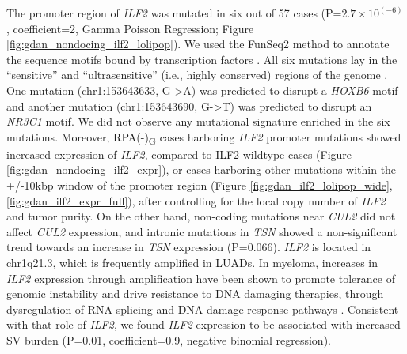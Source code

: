 \documentclass[phd,tocprelim]{cornell}
\begin{document}
The promoter region of \textit{ILF2} was mutated in six out of 57 cases (P=$2.7 \times 10^(-6)$, coefficient=2, Gamma Poisson Regression; Figure \ref{fig:gdan_nondocing_ilf2_lolipop}). We used the FunSeq2 method to annotate the sequence motifs bound by transcription factors \cite{Fu2014-so}. All six mutations lay in the “sensitive” and “ultrasensitive” (i.e., highly conserved) regions of the genome \cite{Khurana2013-qc}. One mutation (chr1:153643633, G->A) was predicted to disrupt a \textit{HOXB6} motif and another mutation (chr1:153643690, G->T) was predicted to disrupt an \textit{NR3C1} motif. We did not observe any mutational signature enriched in the six mutations. Moreover, RPA(-)\textsubscript{G} cases harboring \textit{ILF2} promoter mutations showed increased expression of \textit{ILF2}, compared to ILF2-wildtype cases (Figure \ref{fig:gdan_nondocing_ilf2_expr}), or cases harboring other mutations within the +/-10kbp window of the promoter region (Figure \ref{fig:gdan_ilf2_lolipop_wide}, \ref{fig:gdan_ilf2_expr_full}), after controlling for the local copy number of \textit{ILF2} and tumor purity. On the other hand, non-coding mutations near \textit{CUL2} did not affect \textit{CUL2} expression, and intronic mutations in \textit{TSN} showed a non-significant trend towards an increase in \textit{TSN} expression (P=0.066). \textit{ILF2} is located in chr1q21.3, which is frequently amplified in LUADs. In myeloma, increases in \textit{ILF2} expression through amplification have been shown to promote tolerance of genomic instability and drive resistance to DNA damaging therapies, through dysregulation of RNA splicing and DNA damage response pathways \cite{Marchesini2017-ly}. Consistent with that role of \textit{ILF2}, we found \textit{ILF2} expression to be associated with increased SV burden (P=0.01, coefficient=0.9, negative binomial regression).
\end{document}
